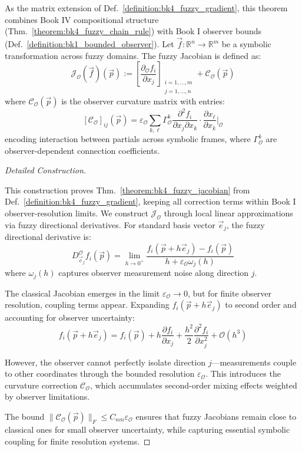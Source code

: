 
\begin{theorem}
\label{theorem:bk4_fuzzy_jacobian}
\par
As the matrix extension of Def.~\ref{definition:bk4_fuzzy_gradient}, this
theorem combines Book IV compositional structure
(Thm.~\ref{theorem:bk4_fuzzy_chain_rule}) with Book I observer bounds
(Def.~\ref{definition:bk1_bounded_observer}).
Let $\vec{f} : \mathbb{R}^n \to \mathbb{R}^m$ be a symbolic transformation
across fuzzy domains. The fuzzy Jacobian is defined as:
\[
\mathcal{J}_{\mathcal{O}}(\vec{f})(\vec{p}) := 
\left[ 
\frac{\partial_{\mathcal{O}} f_i}{\partial x_j}
\right]_{\substack{i=1,\ldots,m \\ j=1,\ldots,n}}
+ 
\mathcal{C}_{\mathcal{O}}(\vec{p})
\]
where $\mathcal{C}_{\mathcal{O}}(\vec{p})$ is the observer curvature matrix with entries:
\[
[\mathcal{C}_{\mathcal{O}}]_{ij}(\vec{p}) = \varepsilon_{\mathcal{O}} \sum_{k,\ell} \Gamma^k_{\mathcal{O}} \frac{\partial^2 f_i}{\partial x_j \partial x_k} \cdot \frac{\partial x_\ell}{\partial x_k}\bigg|_{\mathcal{O}}
\]
encoding interaction between partials across symbolic frames, where $\Gamma^k_{\mathcal{O}}$ are observer-dependent connection coefficients.
\end{theorem}

\begin{proof}[Detailed Construction]
\label{proof:bk4_detailed_construction}
\leavevmode

This construction proves Thm.~\ref{theorem:bk4_fuzzy_jacobian} from Def.~\ref{definition:bk4_fuzzy_gradient}, keeping all correction terms within Book I observer-resolution limits.
We construct $\mathcal{J}_{\mathcal{O}}$ through local linear approximations via fuzzy directional derivatives. For standard basis vector $\vec{e}_j$, the fuzzy directional derivative is:
\[
D_{\vec{e}_j}^{\mathcal{O}} f_i(\vec{p}) = \lim_{h \to 0^+} \frac{f_i(\vec{p} + h\vec{e}_j) - f_i(\vec{p})}{h + \varepsilon_{\mathcal{O}} \omega_j(h)}
\]
where $\omega_j(h)$ captures observer measurement noise along direction $j$.

The classical Jacobian emerges in the limit $\varepsilon_{\mathcal{O}} \to 0$, but for finite observer resolution, coupling terms appear. Expanding $f_i(\vec{p} + h\vec{e}_j)$ to second order and accounting for observer uncertainty:
\[
f_i(\vec{p} + h\vec{e}_j) = f_i(\vec{p}) + h\frac{\partial f_i}{\partial x_j} + \frac{h^2}{2}\frac{\partial^2 f_i}{\partial x_j^2} + \mathcal{O}(h^3)
\]

However, the observer cannot perfectly isolate direction $j$---measurements couple to other coordinates through the bounded resolution $\varepsilon_{\mathcal{O}}$. This introduces the curvature correction $\mathcal{C}_{\mathcal{O}}$, which accumulates second-order mixing effects weighted by observer limitations.

The bound $\|\mathcal{C}_{\mathcal{O}}(\vec{p})\|_F \leq C_{nm} \varepsilon_{\mathcal{O}}$ ensures that fuzzy Jacobians remain close to classical ones for small observer uncertainty, while capturing essential symbolic coupling for finite resolution systems.
\end{proof}


